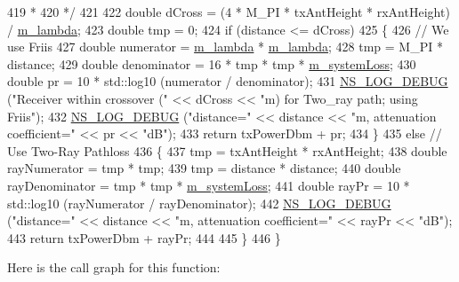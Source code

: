 \begin{DoxyCode}
419 \textcolor{comment}{   *}
420 \textcolor{comment}{   */}
421 
422   \textcolor{keywordtype}{double} dCross = (4 * M\_PI * txAntHeight * rxAntHeight) / \hyperlink{classns3_1_1TwoRayGroundPropagationLossModel_af726ad6c9f16a5bd5d99db02be47fd78}{m\_lambda};
423   \textcolor{keywordtype}{double} tmp = 0;
424   \textcolor{keywordflow}{if} (distance <= dCross)
425     \{
426       \textcolor{comment}{// We use Friis}
427       \textcolor{keywordtype}{double} numerator = \hyperlink{classns3_1_1TwoRayGroundPropagationLossModel_af726ad6c9f16a5bd5d99db02be47fd78}{m\_lambda} * \hyperlink{classns3_1_1TwoRayGroundPropagationLossModel_af726ad6c9f16a5bd5d99db02be47fd78}{m\_lambda};
428       tmp = M\_PI * distance;
429       \textcolor{keywordtype}{double} denominator = 16 * tmp * tmp * \hyperlink{classns3_1_1TwoRayGroundPropagationLossModel_a944fc5bdc91fb21e200374a5f415d826}{m\_systemLoss};
430       \textcolor{keywordtype}{double} pr = 10 * std::log10 (numerator / denominator);
431       \hyperlink{group__logging_ga413f1886406d49f59a6a0a89b77b4d0a}{NS\_LOG\_DEBUG} (\textcolor{stringliteral}{"Receiver within crossover ("} << dCross << \textcolor{stringliteral}{"m) for Two\_ray path; using
       Friis"});
432       \hyperlink{group__logging_ga413f1886406d49f59a6a0a89b77b4d0a}{NS\_LOG\_DEBUG} (\textcolor{stringliteral}{"distance="} << distance << \textcolor{stringliteral}{"m, attenuation coefficient="} << pr << \textcolor{stringliteral}{"dB"});
433       \textcolor{keywordflow}{return} txPowerDbm + pr;
434     \}
435   \textcolor{keywordflow}{else}   \textcolor{comment}{// Use Two-Ray Pathloss}
436     \{
437       tmp = txAntHeight * rxAntHeight;
438       \textcolor{keywordtype}{double} rayNumerator = tmp * tmp;
439       tmp = distance * distance;
440       \textcolor{keywordtype}{double} rayDenominator = tmp * tmp * \hyperlink{classns3_1_1TwoRayGroundPropagationLossModel_a944fc5bdc91fb21e200374a5f415d826}{m\_systemLoss};
441       \textcolor{keywordtype}{double} rayPr = 10 * std::log10 (rayNumerator / rayDenominator);
442       \hyperlink{group__logging_ga413f1886406d49f59a6a0a89b77b4d0a}{NS\_LOG\_DEBUG} (\textcolor{stringliteral}{"distance="} << distance << \textcolor{stringliteral}{"m, attenuation coefficient="} << rayPr << \textcolor{stringliteral}{"dB"});
443       \textcolor{keywordflow}{return} txPowerDbm + rayPr;
444 
445     \}
446 \}
\end{DoxyCode}


Here is the call graph for this function\+:


